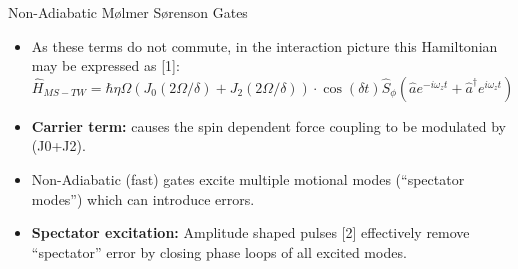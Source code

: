 \documentclass[final]{beamer}
\begin{document}
\begin{frame}{}
\begin{center}
\begin{columns}[t]
\begin{column}{0.49\textwidth}
\begin{alertblock}{Non-Adiabatic Mølmer Sørenson Gates}
      \begin{itemize}
      \item As these terms do not commute, in the interaction picture this Hamiltonian
            may be expressed as [1]:
      \Large$$ \hat{H}_{MS-TW} = \hbar\eta\Omega(J_0(2\Omega/\delta) + J_2(2\Omega/\delta))\cdot \cos{(\delta t)}\hat{S}_{\phi}(\hat{a}e^{-i\omega_zt} + \hat{a}^\dagger e^{i\omega_zt})$$\normalsize
      \end{itemize}
      \begin{minipage}{0.58\textwidth}
      \begin{itemize}
      \item \textbf{Carrier term:} causes the spin dependent force
        coupling to be modulated by (J0+J2).

      \item Non-Adiabatic (fast) gates excite multiple motional modes (``spectator modes'') which can introduce errors.

      \item \textbf{Spectator excitation:} Amplitude shaped pulses
        [2] effectively remove ``spectator'' error by closing
        phase loops of all excited modes.
        

\end{itemize}
\end{minipage}
\end{alertblock}
\end{column}
\end{columns}
\end{center}
\end{frame}
\end{document}
